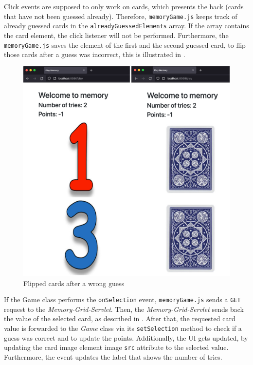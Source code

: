 Click events are supposed to only work on cards, which presents the back (cards that have not been guessed already). Therefore, \texttt{memoryGame.js} keeps track of already guessed cards in the \texttt{alreadyGuessedElements} array. If the array contains the card element, the click listener will not be performed.
Furthermore, the \texttt{memoryGame.js} saves the element of the first and the second guessed card, to flip those cards after a guess was incorrect, this is illustrated in .
\begin{figure}[h]
\centering
\includegraphics[scale=0.1]{images/03_impl/frontend/wrong-guess}
\caption{Flipped cards after a wrong guess}
\label{fig:03_impl_frontend_memGame_flipped}
\end{figure}


If the Game class performs the \texttt{onSelection} event, \texttt{memoryGame.js} sends a \texttt{GET} request to the \textit{Memory-Grid-Servlet}. Then, the \textit{Memory-Grid-Servlet} sends back the value of the selected card, as described in . After that, the requested card value is forwarded to the \textit{Game} class via its \texttt{setSelection} method to check if a guess was correct and to update the points.
Additionally, the UI gets updated, by updating the card image element image \texttt{src} attribute to the selected value. Furthermore, the event updates the label that shows the number of tries.

